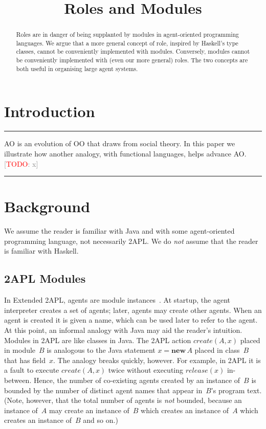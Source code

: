 \documentclass[conference,compsoc]{IEEEtran}
\title{Roles and Modules}
\author{
  \IEEEauthorblockN{Rem Collier and Claudia Grigore} 
  \IEEEauthorblockA{
    School of Computer Science and Informatics\\
    University College Dublin\\
    Belfield Campus, Dublin~4, Ireland\\
    Email: rem.collier@ucd.ie, claudia.grigore@ucdconnect.ie}}
\newcommand{\todo}[1]{{\small \textcolor{gray}{[\textcolor{red}{TODO}: #1]}}}
\newenvironment{notes}{\medskip\hrule\nobreak\smallskip\narrower}{\smallskip\hrule\medskip}
\begin{document}
\maketitle

\begin{abstract}
Roles are in danger of being supplanted by modules in agent-oriented
programming languages.  We argue that a more general concept of role,
inspired by Haskell's type classes, cannot be conveniently implemented with
modules. Conversely, modules cannot be conveniently implemented with (even
our more general) roles. The two concepts are both useful in organising
large agent systems.
\end{abstract}

\section{Introduction}

\begin{notes}
AO is an evolution of OO that draws from social theory. In this paper we
illustrate how another analogy, with functional languages, helps advance 
AO\null. \todo{x}
\end{notes}

\section{Background}

We assume the reader is familiar with Java and with some agent-oriented
programming language, not necessarily 2APL. We do \emph{not} assume that
the reader is familiar with Haskell.

\subsection{2APL Modules}

In Extended 2APL, agents are module
instances~\cite{DBLP:conf/prima/DastaniMS08}. At startup, the agent
interpreter creates a set of agents; later, agents may create other agents.
When an agent is created it is given a name, which can be used later to
refer to the agent. At this point, an informal analogy with Java may aid
the reader's intuition. Modules in 2APL are like classes in Java. The 2APL
action $\mathit{create}(A,x)$ placed in module~$B$ is analogous to the Java
statement $x=\mathbf{new}\,A$ placed in class~$B$ that has field~$x$.  The
analogy breaks quickly, however. For example, in 2APL it is a fault to
execute $\mathit{create}(A,x)$ twice without executing
$\mathit{release}(x)$ in-between. Hence, the number of co-existing agents
created by an instance of~$B$ is bounded by the number of distinct agent
names that appear in~$B$'s program text. (Note, however, that the total
number of agents is \emph{not} bounded, because an instance of~$A$ may
create an instance of~$B$ which creates an instance of~$A$ which creates
an instance of~$B$ and so on.)
\end{document}
